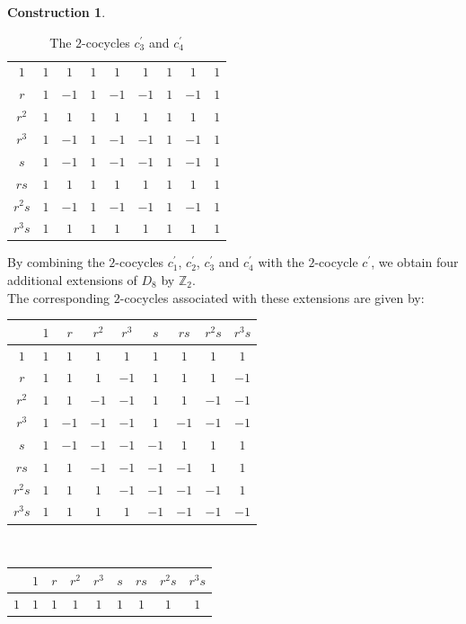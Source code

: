 \documentclass{article}
\theoremstyle{plain}
\theoremstyle{definition}
\newtheorem{const}[thm]{Construction}
\begin{document}
\begin{const}
\begin{table}[H]
\begin{tabular}{ c | c   c   c   c   c   c   c   c}
\hline
$1$ & $1$ & $1$ & $1$ & $1$ & $1$ & $1$ & $1$ & $1$ \\
$r$ & $1$ & $-1$ & $1$ & $-1$ & $-1$ & $1$ & $-1$ & $1$ \\
$r^2$ & $1$ & $1$ & $1$ & $1$ & $1$ & $1$ & $1$ & $1$ \\
$r^3$ & $1$ & $-1$ & $1$ & $-1$ & $-1$ & $1$ & $-1$ & $1$ \\
$s$ & $1$ & $-1$ & $1$ & $-1$ & $-1$ & $1$ & $-1$ & $1$ \\
$rs$ & $1$ & $1$ & $1$ & $1$ & $1$ & $1$ & $1$ & $1$ \\
$r^2s$ & $1$ & $-1$ & $1$ & $-1$ & $-1$ & $1$ & $-1$ & $1$ \\
$r^3s$ & $1$ & $1$ & $1$ & $1$ & $1$ & $1$ & $1$ & $1$
\end{tabular}
\caption{The $2$-cocycles $c^\prime_3$ and $c^\prime_4$}
\label{comingk4-2}
\end{table}
By combining the $2$-cocycles $c^\prime_1$, $c^\prime_2$, $c^\prime_3$ and $c^\prime_4$ with the $2$-cocycle $c^\prime$, we obtain four additional extensions of $D_8$ by $\mathbb{Z}_2$. \\
The corresponding $2$-cocycles associated with these extensions are given by:
\begin{table}[H]
\centering
\begin{tabular}{ c | c   c   c   c   c   c   c   c}
& $1$ & $r$ & $r^2$ & $r^3$ & $s$ & $rs$ & $r^2s$ & $r^3s$ \\
\hline
$1$ & $1$ & $1$ & $1$ & $1$ & $1$ & $1$ & $1$ & $1$ \\
$r$ & $1$ & $1$ & $1$ & $-1$ & $1$ & $1$ & $1$ & $-1$ \\
$r^2$ & $1$ & $1$ & $-1$ & $-1$ & $1$ & $1$ & $-1$ & $-1$ \\
$r^3$ & $1$ & $-1$ & $-1$ & $-1$ & $1$ & $-1$ & $-1$ & $-1$ \\
$s$ & $1$ & $-1$ & $-1$ & $-1$ & $-1$ & $1$ & $1$ & $1$ \\
$rs$ & $1$ & $1$ & $-1$ & $-1$ & $-1$ & $-1$ & $1$ & $1$ \\
$r^2s$ & $1$ & $1$ & $1$ & $-1$ & $-1$ & $-1$ & $-1$ & $1$ \\
$r^3s$ & $1$ & $1$ & $1$ & $1$ & $-1$ & $-1$ & $-1$ & $-1$
\end{tabular} ~~~
\begin{tabular}{ c | c   c   c   c   c   c   c   c}
& $1$ & $r$ & $r^2$ & $r^3$ & $s$ & $rs$ & $r^2s$ & $r^3s$ \\
\hline
$1$ & $1$ & $1$ & $1$ & $1$ & $1$ & $1$ & $1$ & $1$ \\

\end{tabular}
\end{table}
\end{const}
\end{document}
